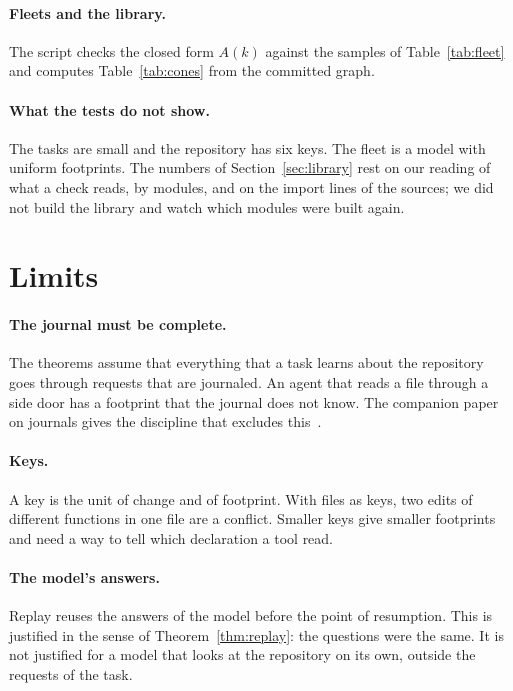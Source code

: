 \documentclass[acmsmall,nonacm,screen]{acmart}
\begin{document}
\paragraph{Fleets and the library.} The script checks the closed form $A(k)$ against the
samples of Table~\ref{tab:fleet} and computes Table~\ref{tab:cones} from the committed
graph.

\paragraph{What the tests do not show.} The tasks are small and the repository has six keys.
The fleet is a model with uniform footprints. The numbers of Section~\ref{sec:library} rest
on our reading of what a check reads, by modules, and on the import lines of the sources; we
did not build the library and watch which modules were built again.

\section{Limits}
\label{sec:limits}

\paragraph{The journal must be complete.} The theorems assume that everything that a task
learns about the repository goes through requests that are journaled. An agent that reads a
file through a side door has a footprint that the journal does not know. The companion
paper on journals gives the discipline that excludes this~\citep{tpp8}.

\paragraph{Keys.} A key is the unit of change and of footprint. With files as keys, two
edits of different functions in one file are a conflict. Smaller keys give smaller
footprints and need a way to tell which declaration a tool read.

\paragraph{The model's answers.} Replay reuses the answers of the model before the point of
resumption. This is justified in the sense of Theorem~\ref{thm:replay}: the questions were
the same. It is not justified for a model that looks at the repository on its own, outside
the requests of the task.
\end{document}
